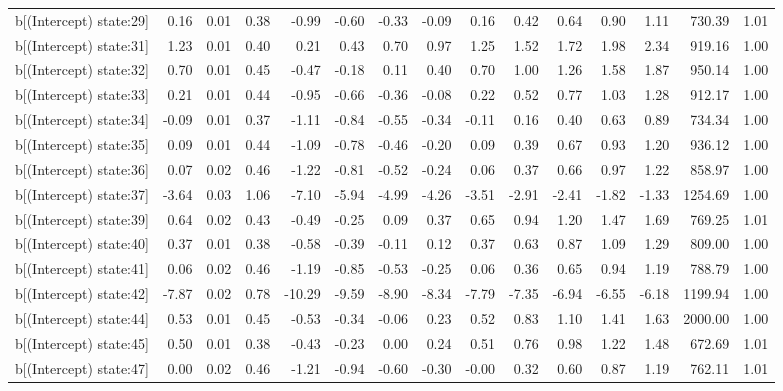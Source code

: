 \begin{table}[ht]
\begin{tabular}{rrrrrrrrrrrrrrr}
  b[(Intercept) state:29] & 0.16 & 0.01 & 0.38 & -0.99 & -0.60 & -0.33 & -0.09 & 0.16 & 0.42 & 0.64 & 0.90 & 1.11 & 730.39 & 1.01 \\ 
  b[(Intercept) state:31] & 1.23 & 0.01 & 0.40 & 0.21 & 0.43 & 0.70 & 0.97 & 1.25 & 1.52 & 1.72 & 1.98 & 2.34 & 919.16 & 1.00 \\ 
  b[(Intercept) state:32] & 0.70 & 0.01 & 0.45 & -0.47 & -0.18 & 0.11 & 0.40 & 0.70 & 1.00 & 1.26 & 1.58 & 1.87 & 950.14 & 1.00 \\ 
  b[(Intercept) state:33] & 0.21 & 0.01 & 0.44 & -0.95 & -0.66 & -0.36 & -0.08 & 0.22 & 0.52 & 0.77 & 1.03 & 1.28 & 912.17 & 1.00 \\ 
  b[(Intercept) state:34] & -0.09 & 0.01 & 0.37 & -1.11 & -0.84 & -0.55 & -0.34 & -0.11 & 0.16 & 0.40 & 0.63 & 0.89 & 734.34 & 1.00 \\ 
  b[(Intercept) state:35] & 0.09 & 0.01 & 0.44 & -1.09 & -0.78 & -0.46 & -0.20 & 0.09 & 0.39 & 0.67 & 0.93 & 1.20 & 936.12 & 1.00 \\ 
  b[(Intercept) state:36] & 0.07 & 0.02 & 0.46 & -1.22 & -0.81 & -0.52 & -0.24 & 0.06 & 0.37 & 0.66 & 0.97 & 1.22 & 858.97 & 1.00 \\ 
  b[(Intercept) state:37] & -3.64 & 0.03 & 1.06 & -7.10 & -5.94 & -4.99 & -4.26 & -3.51 & -2.91 & -2.41 & -1.82 & -1.33 & 1254.69 & 1.00 \\ 
  b[(Intercept) state:39] & 0.64 & 0.02 & 0.43 & -0.49 & -0.25 & 0.09 & 0.37 & 0.65 & 0.94 & 1.20 & 1.47 & 1.69 & 769.25 & 1.01 \\ 
  b[(Intercept) state:40] & 0.37 & 0.01 & 0.38 & -0.58 & -0.39 & -0.11 & 0.12 & 0.37 & 0.63 & 0.87 & 1.09 & 1.29 & 809.00 & 1.00 \\ 
  b[(Intercept) state:41] & 0.06 & 0.02 & 0.46 & -1.19 & -0.85 & -0.53 & -0.25 & 0.06 & 0.36 & 0.65 & 0.94 & 1.19 & 788.79 & 1.00 \\ 
  b[(Intercept) state:42] & -7.87 & 0.02 & 0.78 & -10.29 & -9.59 & -8.90 & -8.34 & -7.79 & -7.35 & -6.94 & -6.55 & -6.18 & 1199.94 & 1.00 \\ 
  b[(Intercept) state:44] & 0.53 & 0.01 & 0.45 & -0.53 & -0.34 & -0.06 & 0.23 & 0.52 & 0.83 & 1.10 & 1.41 & 1.63 & 2000.00 & 1.00 \\ 
  b[(Intercept) state:45] & 0.50 & 0.01 & 0.38 & -0.43 & -0.23 & 0.00 & 0.24 & 0.51 & 0.76 & 0.98 & 1.22 & 1.48 & 672.69 & 1.01 \\ 
  b[(Intercept) state:47] & 0.00 & 0.02 & 0.46 & -1.21 & -0.94 & -0.60 & -0.30 & -0.00 & 0.32 & 0.60 & 0.87 & 1.19 & 762.11 & 1.01 \\ 

\end{tabular}
\end{table}
